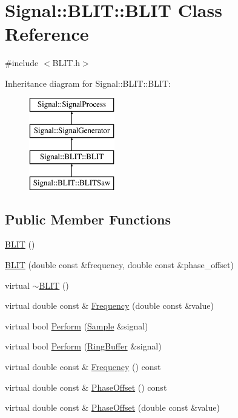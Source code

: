 \hypertarget{class_signal_1_1_b_l_i_t_1_1_b_l_i_t}{\section{Signal\+:\+:B\+L\+I\+T\+:\+:B\+L\+I\+T Class Reference}
\label{class_signal_1_1_b_l_i_t_1_1_b_l_i_t}
}


{\ttfamily \#include $<$B\+L\+I\+T.\+h$>$}

Inheritance diagram for Signal\+:\+:B\+L\+I\+T\+:\+:B\+L\+I\+T\+:\begin{figure}[H]
\begin{center}
\leavevmode
\includegraphics[height=4.000000cm]{class_signal_1_1_b_l_i_t_1_1_b_l_i_t}
\end{center}
\end{figure}
\subsection*{Public Member Functions}
\begin{DoxyCompactItemize}
\item 
\hyperlink{class_signal_1_1_b_l_i_t_1_1_b_l_i_t_ad22461c308981ee86ddc8b992bfbaf27}{B\+L\+I\+T} ()
\item 
\hyperlink{class_signal_1_1_b_l_i_t_1_1_b_l_i_t_af4f90ac6dfddc173dd0b381f6582dac9}{B\+L\+I\+T} (double const \&frequency, double const \&phase\+\_\+offset)
\item 
virtual \hyperlink{class_signal_1_1_b_l_i_t_1_1_b_l_i_t_a9355800dce797a6d35d8bbfc7eb9b834}{$\sim$\+B\+L\+I\+T} ()
\item 
virtual double const \& \hyperlink{class_signal_1_1_b_l_i_t_1_1_b_l_i_t_a59110620478308054d4c932c613e5cc6}{Frequency} (double const \&value)
\item 
virtual bool \hyperlink{class_signal_1_1_b_l_i_t_1_1_b_l_i_t_a98982b34bc6c9ca4c2e91550afa31375}{Perform} (\hyperlink{class_signal_1_1_sample}{Sample} \&signal)
\item 
virtual bool \hyperlink{class_signal_1_1_b_l_i_t_1_1_b_l_i_t_a2f0ee604ed0e67557aa9f7e7f50d80ec}{Perform} (\hyperlink{class_signal_1_1_ring_buffer}{Ring\+Buffer} \&signal)
\item 
virtual double const \& \hyperlink{class_signal_1_1_signal_generator_a96af42ee68f94e9b04d034fd68b73ecd}{Frequency} () const 
\item 
virtual double const \& \hyperlink{class_signal_1_1_signal_generator_ac2538ec946f001e394d2416fda698d1c}{Phase\+Offset} () const 
\item 
virtual double const \& \hyperlink{class_signal_1_1_signal_generator_ac6a103ff72beaa338f6d18c812522d78}{Phase\+Offset} (double const \&value)
\end{DoxyCompactItemize}
